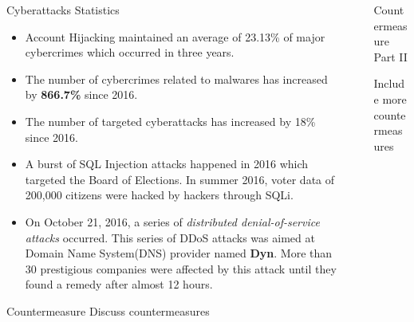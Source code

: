 \documentclass[final]{beamer}
\newlength{\sepwidth}
\newlength{\colwidth}
\newcommand{\separatorcolumn}{\begin{column}{\sepwidth}\end{column}}
\begin{document}
\begin{frame}[t]
\begin{columns}[t]
\begin{column}{\colwidth}
\begin{block}{Cyberattacks Statistics}
    \begin{itemize}
        \item Account Hijacking maintained an average of 23.13\% of major cybercrimes which occurred in three years. 
        \item The number of cybercrimes related to malwares has increased by \textbf{866.7\%} since 2016. 
        \item The number of targeted cyberattacks has increased by 18\% since 2016. 
        \item A burst of SQL Injection attacks happened in 2016 which targeted the Board of Elections. In summer 2016, voter data of 200,000 citizens were hacked by hackers through SQLi. 
        \item On October 21, 2016, a series of \textit{distributed denial-of-service attacks} occurred. This series of DDoS attacks was aimed at Domain Name System(DNS) provider named \textbf{Dyn}. More than 30 prestigious companies were affected by this attack until they found a remedy after almost 12 hours. 
    \end{itemize}

      

       

  \end{block}

  \begin{block}{Countermeasure}
   Discuss countermeasures


  \end{block}

 

\end{column}

\separatorcolumn

\begin{column}{\colwidth}

  \begin{block}{Countermeasure Part II}

    Include more countermeasures 


\end{block}
\end{column}
\end{columns}
\end{frame}
\end{document}
